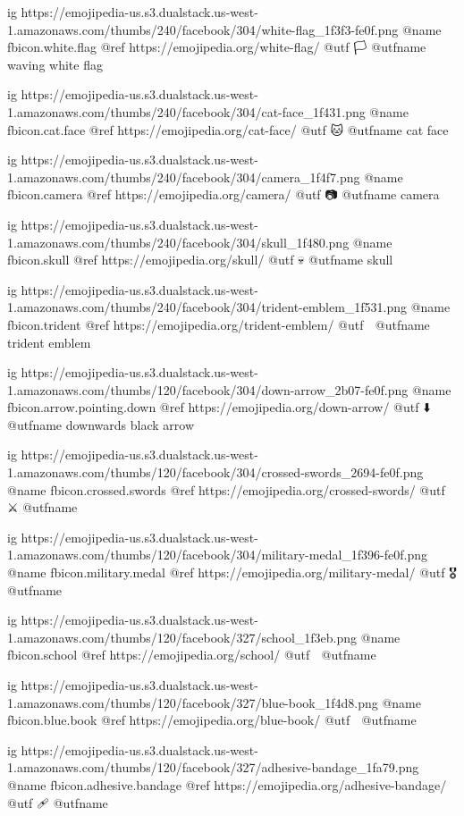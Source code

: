   ig https://emojipedia-us.s3.dualstack.us-west-1.amazonaws.com/thumbs/240/facebook/304/white-flag_1f3f3-fe0f.png
  @name fbicon.white.flag
  @ref https://emojipedia.org/white-flag/
  @utf 🏳
  @utfname waving white flag

	ig https://emojipedia-us.s3.dualstack.us-west-1.amazonaws.com/thumbs/240/facebook/304/cat-face_1f431.png
	@name fbicon.cat.face
	@ref https://emojipedia.org/cat-face/
	@utf 🐱
	@utfname cat face

	ig https://emojipedia-us.s3.dualstack.us-west-1.amazonaws.com/thumbs/240/facebook/304/camera_1f4f7.png
	@name fbicon.camera
	@ref https://emojipedia.org/camera/
	@utf 📷
	@utfname camera

	ig https://emojipedia-us.s3.dualstack.us-west-1.amazonaws.com/thumbs/240/facebook/304/skull_1f480.png
	@name fbicon.skull
	@ref https://emojipedia.org/skull/
	@utf 💀
	@utfname skull

	ig https://emojipedia-us.s3.dualstack.us-west-1.amazonaws.com/thumbs/240/facebook/304/trident-emblem_1f531.png
	@name fbicon.trident
	@ref https://emojipedia.org/trident-emblem/
	@utf 🔱
	@utfname trident emblem

	ig https://emojipedia-us.s3.dualstack.us-west-1.amazonaws.com/thumbs/120/facebook/304/down-arrow_2b07-fe0f.png
	@name fbicon.arrow.pointing.down
	@ref https://emojipedia.org/down-arrow/
	@utf ⬇️
	@utfname downwards black arrow

	ig https://emojipedia-us.s3.dualstack.us-west-1.amazonaws.com/thumbs/120/facebook/304/crossed-swords_2694-fe0f.png
	@name fbicon.crossed.swords
	@ref https://emojipedia.org/crossed-swords/
	@utf ⚔️
	@utfname

	ig https://emojipedia-us.s3.dualstack.us-west-1.amazonaws.com/thumbs/120/facebook/304/military-medal_1f396-fe0f.png
	@name fbicon.military.medal
	@ref https://emojipedia.org/military-medal/
	@utf 🎖
	@utfname

	ig https://emojipedia-us.s3.dualstack.us-west-1.amazonaws.com/thumbs/120/facebook/327/school_1f3eb.png
	@name fbicon.school
	@ref https://emojipedia.org/school/
	@utf 🏫
	@utfname



	ig https://emojipedia-us.s3.dualstack.us-west-1.amazonaws.com/thumbs/120/facebook/327/blue-book_1f4d8.png
	@name fbicon.blue.book
	@ref https://emojipedia.org/blue-book/
	@utf 📘
	@utfname

	ig https://emojipedia-us.s3.dualstack.us-west-1.amazonaws.com/thumbs/120/facebook/327/adhesive-bandage_1fa79.png
	@name fbicon.adhesive.bandage
	@ref https://emojipedia.org/adhesive-bandage/
	@utf 🩹
	@utfname

